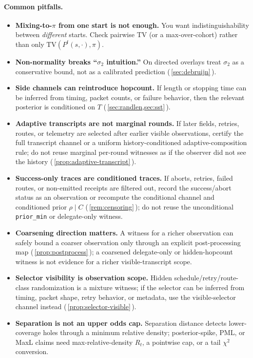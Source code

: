 \documentclass[11pt]{article}
\newcommand{\TV}{\mathrm{TV}}
\begin{document}
\paragraph{Common pitfalls.}
\begin{itemize}[leftmargin=1.2em]
\item \textbf{Mixing-to-$\pi$ from one start is not enough.} You want indistinguishability between \emph{different} starts.
Check pairwise TV (or a max-over-cohort) rather than only $\TV(P^t(s,\cdot),\pi)$.
\item \textbf{Non-normality breaks ``$\sigma_2$ intuition.''} On directed overlays treat $\sigma_2$ as a conservative bound,
not as a calibrated prediction (\,\cref{sec:debruijn}\,).
\item \textbf{Side channels can reintroduce hopcount.} If length or stopping time can be inferred from timing, packet counts, or failure behavior,
then the relevant posterior is conditioned on $T$ (\,\cref{sec:randlen,sec:sst}\,).
\item \textbf{Adaptive transcripts are not marginal rounds.} If later fields, retries, routes, or telemetry are selected after earlier visible observations, certify the full transcript channel or a uniform history-conditioned adaptive-composition rule; do not reuse marginal per-round witnesses as if the observer did not see the history (\,\cref{prop:adaptive-transcript}\,).
\item \textbf{Success-only traces are conditioned traces.} If aborts, retries, failed routes, or non-emitted receipts are filtered out, record the success/abort status as an observation or recompute the conditional channel and conditioned prior $\rho\mid C$ (\,\cref{rem:censoring}\,); do not reuse the unconditional \texttt{prior\_min} or delegate-only witness.
\item \textbf{Coarsening direction matters.} A witness for a richer observation can safely bound a coarser observation only through an explicit post-processing map (\,\cref{prop:postprocess}\,); a coarsened delegate-only or hidden-hopcount witness is not evidence for a richer visible-transcript scope.
\item \textbf{Selector visibility is observation scope.} Hidden schedule/retry/route-class randomization is a mixture witness; if the selector can be inferred from timing, packet shape, retry behavior, or metadata, use the visible-selector channel instead (\,\cref{prop:selector-visible}\,).
\item \textbf{Separation is not an upper odds cap.} Separation distance detects lower-coverage holes through a minimum relative density; posterior-spike, PML, or MaxL claims need max-relative-density $R_t$, a pointwise cap, or a tail $\chi^2$ conversion.

\end{itemize}
\end{document}
